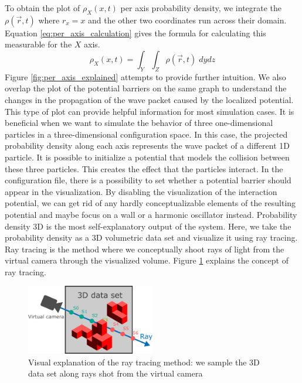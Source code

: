 To obtain the plot of $\rho_X(x, t)$ per axis probability density, we integrate the $\rho(\vec{r}, t)$ where $r_x = x$ and the other two coordinates run across their domain.
Equation \ref{eq:per_axis_calculation} gives the formula for calculating this measurable for the $X$ axis.
\begin{equation}
	\rho_X(x, t) = \int_Y \int_Z \rho(\vec{r}, t)\; dy dz
	\label{eq:per_axis_calculation}
\end{equation}
Figure \ref{fig:per_axis_explained} attempts to provide further intuition.
We also overlap the plot of the potential barriers on the same graph to understand the changes in the propagation of the wave packet caused by the localized potential.
This type of plot can provide helpful information for most simulation cases. It is beneficial when we want to simulate the behavior of three one-dimensional particles in a three-dimensional configuration space.
In this case, the projected probability density along each axis represents the wave packet of a different 1D particle.
It is possible to initialize a potential that models the collision between these three particles.
This creates the effect that the particles interact.
In the configuration file, there is a possibility to set whether a potential barrier should appear in the visualization.
By disabling the visualization of the interaction potential, we can get rid of any hardly conceptualizable elements of the resulting potential and maybe focus on a wall or a harmonic oscillator instead.
Probability density 3D is the most self-explanatory output of the system.
Here, we take the probability density as a 3D volumetric data set and visualize it using ray tracing.
Ray tracing is the method where we conceptually shoot rays of light from the virtual camera through the visualized volume.
Figure \ref{fig:ray_tracing_method} explains the concept of ray tracing.
\begin{figure}[H]
	\centering
	\includegraphics[width=0.5\textwidth]{figures/ray_tracing_visualization.pdf}
	\caption{Visual explanation of the ray tracing method: we sample the 3D data set along rays shot from the virtual camera}
	\label{fig:ray_tracing_method}
\end{figure}
